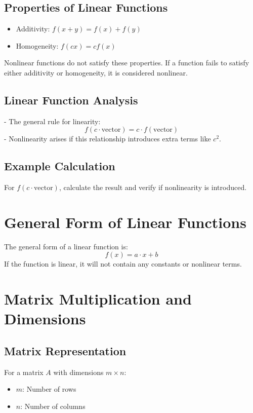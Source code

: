 \documentclass{article}
\begin{document}
\subsection{Properties of Linear Functions}
\begin{itemize}
    \item Additivity: $f(x + y) = f(x) + f(y)$
    \item Homogeneity: $f(cx) = c f(x)$
\end{itemize}

Nonlinear functions do not satisfy these properties. If a function fails to satisfy either additivity or homogeneity, it is considered nonlinear.

\subsection{Linear Function Analysis}
- The general rule for linearity: 
\[
f(c \cdot \text{vector}) = c \cdot f(\text{vector})
\]
- Nonlinearity arises if this relationship introduces extra terms like $c^2$.

\subsection{Example Calculation}
For $f(c \cdot \text{vector})$, calculate the result and verify if nonlinearity is introduced.

\section{General Form of Linear Functions}

The general form of a linear function is:
\[
f(x) = a \cdot x + b
\]
If the function is linear, it will not contain any constants or nonlinear terms.

\section{Matrix Multiplication and Dimensions}

\subsection{Matrix Representation}
For a matrix $A$ with dimensions $m \times n$:
\begin{itemize}
    \item $m$: Number of rows
    \item $n$: Number of columns
\end{itemize}
\end{document}
